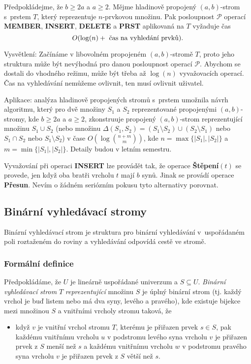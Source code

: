\documentclass[a4paper,12pt]{article}
\begin{document}
\begin{veta}Předpokládejme, že $b\ge 2a$ a $a\ge 2$. Mějme 
hladinově propojený $(a,b)$-strom s~prstem $T$, který reprezentuje 
$n$-prvkovou množinu. Pak posloupnost $\mathcal P$ operací {\bf MEMBER},
{\bf INSERT}, {\bf DELETE} a {\bf PRST} aplikovaná na $T$ vyžaduje čas 
$$O(\log(n)+\text{\rm\ čas na vyhledání prvků})
.$$
\end{veta}

Vysvětlení: Začínáme v libovolném 
propojeném $(a,b)$-stro\-mě $T$, proto jeho struktura 
může být nevýhodná pro danou pos\-loupnost operací $
\mathcal P$. 
Abychom se dostali do vhodného režimu, může 
být třeba až $\log(n)$ vyvažovacích operací. Čas na 
vy\-hledává\-ní nemůžeme ovlivnit, ten musí 
ovlivnit uživatel.

Aplikace: analýza hladinově propojených stromů s~prstem 
u\-mož\-nila návrh algoritmu, který pro dvě množiny $
S_1$ a $S_2$ 
repre\-zentované propojenými $(a,b)$-stromy, kde $b\ge 2a$ a 
$a\ge 2$, 
zkonstruuje propojený $(a,b)$-strom reprezentující množinu 
$S_1\cup S_2$ (nebo množinu $\Delta (S_1,S_2)=(S_1\setminus S_
2)\cup (S_2\setminus S_1)$ nebo 
$S_1\cap S_2$ nebo $S_1\setminus S_2$) v čase $O(\log\binom {n
+m}m)$, kde 
$n=\max\{|S_1|,|S_2|\}$ a $m=\min\{|S_1|,|S_2|\}$. Detaily budou v letním 
semestru.

Vyvažování při operaci {\bf INSERT} lze provádět 
tak, že operace {\bf Štěpení$(t)$} se provede, jen když oba 
bratři vrcholu $t$ mají $b$ synů. Jinak se provádí 
operace {\bf Přesun}. Nevím o žádném seriózním pokusu tyto 
alternativy porovnat.   



\subsection{Binární vyhledávací stromy}

Binární vyhledávací strom je struktura pro binár\-ní 
vyhledávání v~uspořáda\-ném poli rozta\-ženém do roviny a 
vyhledávání odpo\-ví\-dá cestě ve stro\-mě.  

\subsubsection{Formální definice}

Předpokládáme, že $U$ je lineárně uspořádané 
univerzum a $S\subseteq U$.  \emph{Binární} \emph{vyhledávací} 
\emph{strom} $T$ \emph{reprezentující} množinu $S$ je úplný 
binární strom (tj. každý vrchol je buď listem nebo má 
dva syny, levého a pravého), kde existuje bijekce mezi 
množinou $S$ a vnitřními vrcholy stromu taková, že
\begin{itemize}
\item
když $v$ je vnitřní vrchol stromu $T$, kterému je přiřazen 
prvek $s\in S$, pak každému vnitřnímu vrcholu $u$ v 
podstromu levého syna vrcholu $v$ je přiřazen prvek z $S$ 
menší než $s$ a každému vnitřnímu vrcholu $
w$ v 
podstromu pravého syna vrcholu $v$ je přiřazen prvek z $S$ 
větší než $s$.
\end{itemize}
\end{document}
